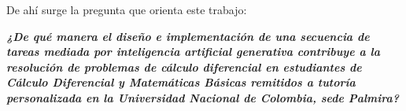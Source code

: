 De ahí surge la pregunta que orienta este trabajo:

\begin{center}
\textbf{\textit{¿De qué manera el diseño e implementación de una secuencia de tareas mediada por inteligencia artificial generativa contribuye a la resolución de problemas de cálculo diferencial en estudiantes de Cálculo Diferencial y Matemáticas Básicas remitidos a tutoría personalizada en la Universidad Nacional de Colombia, sede Palmira?}}
\end{center}
